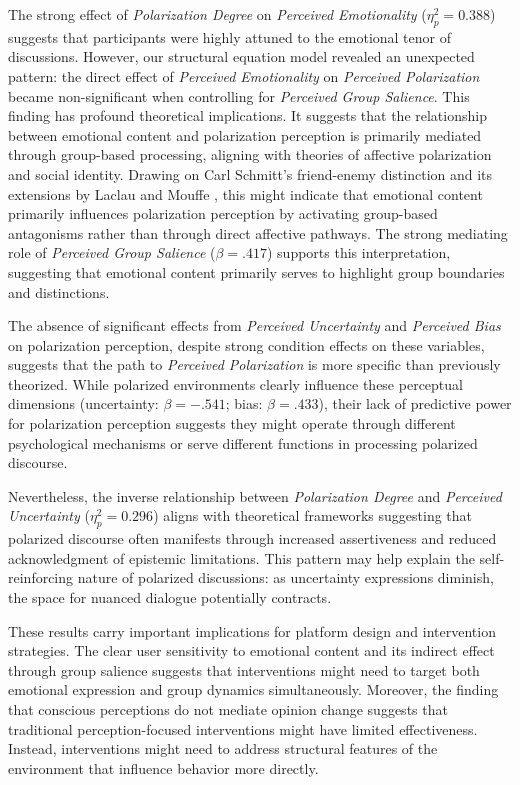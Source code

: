 The strong effect of \emph{Polarization Degree} on \emph{Perceived Emotionality} ($\eta_p^2 = 0.388$) suggests that participants were highly attuned to the emotional tenor of discussions. However, our structural equation model revealed an unexpected pattern: the direct effect of \emph{Perceived Emotionality} on \emph{Perceived Polarization} became non-significant when controlling for \emph{Perceived Group Salience}. This finding has profound theoretical implications. It suggests that the relationship between emotional content and polarization perception is primarily mediated through group-based processing, aligning with theories of affective polarization and social identity. Drawing on Carl Schmitt's friend-enemy distinction \citep{schmitt_concept_2008} and its extensions by Laclau and Mouffe \citep{laclau_hegemony_2014}, this might indicate that emotional content primarily influences polarization perception by activating group-based antagonisms rather than through direct affective pathways. The strong mediating role of \emph{Perceived Group Salience} ($\beta = .417$) supports this interpretation, suggesting that emotional content primarily serves to highlight group boundaries and distinctions.

The absence of significant effects from \emph{Perceived Uncertainty} and \emph{Perceived Bias} on polarization perception, despite strong condition effects on these variables, suggests that the path to \emph{Perceived Polarization} is more specific than previously theorized. While polarized environments clearly influence these perceptual dimensions (uncertainty: $\beta = -.541$; bias: $\beta = .433$), their lack of predictive power for polarization perception suggests they might operate through different psychological mechanisms or serve different functions in processing polarized discourse.

Nevertheless, the inverse relationship between \emph{Polarization Degree} and \emph{Perceived Uncertainty} ($\eta_p^2 = 0.296$) aligns with theoretical frameworks suggesting that polarized discourse often manifests through increased assertiveness and reduced acknowledgment of epistemic limitations. This pattern may help explain the self-reinforcing nature of polarized discussions: as uncertainty expressions diminish, the space for nuanced dialogue potentially contracts.

These results carry important implications for platform design and intervention strategies. The clear user sensitivity to emotional content and its indirect effect through group salience suggests that interventions might need to target both emotional expression and group dynamics simultaneously. Moreover, the finding that conscious perceptions do not mediate opinion change suggests that traditional perception-focused interventions might have limited effectiveness. Instead, interventions might need to address structural features of the environment that influence behavior more directly.


